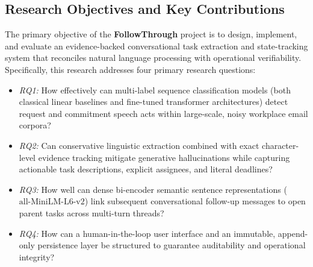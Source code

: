 \documentclass[conference]{IEEEtran}
\begin{document}
\subsection{Research Objectives and Key Contributions}
The primary objective of the \textbf{FollowThrough} project is to design, implement, and evaluate an evidence-backed conversational task extraction and state-tracking system that reconciles natural language processing with operational verifiability. Specifically, this research addresses four primary research questions:
\begin{itemize}
    \item \textit{RQ1:} How effectively can multi-label sequence classification models (both classical linear baselines and fine-tuned transformer architectures) detect request and commitment speech acts within large-scale, noisy workplace email corpora?
    \item \textit{RQ2:} Can conservative linguistic extraction combined with exact character-level evidence tracking mitigate generative hallucinations while capturing actionable task descriptions, explicit assignees, and literal deadlines?
    \item \textit{RQ3:} How well can dense bi-encoder semantic sentence representations ($\text{all-MiniLM-L6-v2}$) link subsequent conversational follow-up messages to open parent tasks across multi-turn threads?
    \item \textit{RQ4:} How can a human-in-the-loop user interface and an immutable, append-only persistence layer be structured to guarantee auditability and operational integrity?
\end{itemize}
\end{document}
